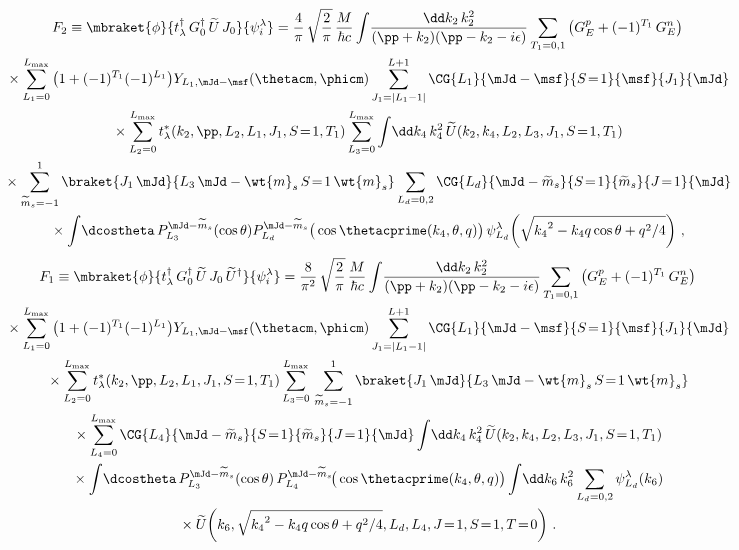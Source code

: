   \begin{multline}
   F_2 \equiv \mbraket{\phi}{t_\lambda ^\dag \, G_0^\dag \, \widetilde{U} \,
   J_0}{\psi_i^\lambda}
   = \frac{4}{\pi} \, \sqrt{\frac{2}{\pi}} \,\frac{M}{\hbar c}
   \int \! \frac{\dd k_2 \, k_2^2}{(\pp + k_2)(\pp - k_2 - i \epsilon)}
   \sum_{T_1 = 0,1} \big(G_E ^p + (-1)^{T_1} \,G_E^n\big) \\
   \null \times
   \sum_{L_1 = 0}^{L_{\rm max}} \big(1 + (-1)^{T_1} (-1)^{L_1}\big)
   Y_{L_1 , \mJd - \msf} (\thetacm, \phicm)
   \sum_{J_1 = |L_1 - 1|}^{L+1}
   \CG{L_1}{\mJd - \msf}{S\!=\!1}{\msf}{J_1}{\mJd} \\
   \null \times
   \sum_{L_2 = 0}^{L_{\rm max}}
    t^\ast_\lambda(k_2, \pp, L_2, L_1, J_1, S\!=\!1,T_1)
   \sum_{L_3 = 0}^{L_{\rm max}} \int \! \dd k_4 \, k_4^2 \,
   \widetilde{U}(k_2, k_4, L_2, L_3, J_1, S\!=\!1, T_1) \\
   \null \times
   \sum_{\widetilde{m}_s = -1}^1
   \braket{J_1 \, \mJd}{L_3 \, \mJd - \wt{m}_s \, S\!=\!1 \, \wt{m}_s}
   \sum_{L_d = 0, 2}
   \CG{L_d}{\mJd - \widetilde{m}_s}{S\!=\!1}{\widetilde{m}_s}{J\!=\!1}{\mJd} \\
   \null \times
   \int \! \dcostheta \, P_{L_3}^{\mJd - \widetilde{m}_s}(\cos \theta)
   P_{L_d}^{\mJd - \widetilde{m}_s} \big(\cos \thetacprime(k_4, \theta, q)\big)
   \, \psi_{L_d}^\lambda\!\left(\sqrt{{k_4}^2 - k_4 q \cos\theta + q^2/4}\right)
   \,,
  \label{eq:F2}
  \end{multline}
  \begin{multline}
   F_1 \equiv \mbraket{\phi}{t_\lambda ^\dag \, G_0^\dag \, \widetilde{U} \,
   J_0 \, \widetilde{U}^\dag}{\psi_i^\lambda}
   = \frac{8}{\pi^2} \, \sqrt{\frac{2}{\pi}} \, \frac{M}{\hbar c}
   \int \! \frac{\dd k_2 \, k_2^2}{(\pp + k_2)(\pp - k_2 - i \epsilon)}
   \sum_{T_1 = 0,1} \big(G_E ^p + (-1)^{T_1} \,G_E^n\big) \\
   \null \times
   \sum_{L_1 = 0}^{L_{\rm max}} \big(1 + (-1)^{T_1} (-1)^{L_1}\big)
   Y_{L_1 , \mJd - \msf} (\thetacm, \phicm)
   \sum_{J_1 = |L_1 - 1|}^{L+1}
    \CG{L_1}{\mJd - \msf}{S\!=\!1}{\msf}{J_1}{\mJd} \\
    \null \times
   \sum_{L_2 = 0}^{L_{\rm max}}
    t^\ast_\lambda(k_2, \pp, L_2, L_1, J_1, S\!=\!1, T_1)
    \sum_{L_3 = 0}^{L_{\rm max}} \, \sum_{\widetilde{m}_s = -1}^1
    \braket{J_1 \, \mJd}{L_3 \, \mJd - \wt{m}_s \, S\!=\!1 \, \wt{m}_s} \\
   \null \times \sum_{L_4 = 0}^{L_{\rm max}}
    \CG{L_4}{\mJd - \widetilde{m}_s}{S\!=\!1}{\widetilde{m}_s}{J\!=\!1}{\mJd}
    \int \! \dd k_4 \, k_4^2 \,
    \widetilde{U}(k_2, k_4, L_2, L_3, J_1, S\!=\!1, T_1) \\
    \null \times
   \int \! \dcostheta \, P_{L_3}^{\mJd - \widetilde{m}_s}(\cos \theta) \,
   P_{L_4}^{\mJd - \widetilde{m}_s}\!\big(\cos \thetacprime(k_4, \theta, q)\big)
   \int \! \dd k_6 \, k_6^2
   \sum_{L_d = 0, 2} \psi_{L_d}^\lambda (k_6) \\
   \null \times
   \widetilde{U}\!\left(
    k_6, \sqrt{{k_4}^2 - k_4 q \cos\theta + q^2/4}, L_d, L_4, J\!=\!1, S\!=\!1,
    T\!=\!0  \right)  \,.
  \label{eq:F1}
  \end{multline}


